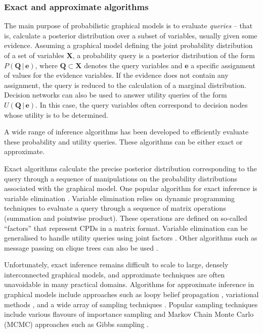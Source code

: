 \subsubsection*{Exact and approximate algorithms}
The main purpose of probabilistic graphical models is to evaluate \textit{queries} -- that is, calculate a posterior distribution over a subset of variables, usually given some evidence. Assuming a graphical model defining the joint probability distribution of a set of variables $\mathbf{X}$, a probability query is a posterior distribution of the form $P(\mathbf{Q}  \, | \, \mathbf{e})$, where $\mathbf{Q} \subset \mathbf{X}$ denotes the query variables and $\mathbf{e}$ a specific assignment of values for the evidence variables.  If the evidence does not contain any assignment, the query is reduced to the calculation of a marginal distribution.  Decision networks can also be used to answer utility queries of the form $U(\mathbf{Q} \, | \, \mathbf{e})$.  In this case, the query variables often correspond to decision nodes whose utility is to be determined.

A wide range of inference algorithms has been developed to efficiently evaluate these probability and utility queries. These algorithms can be either exact or approximate.  

Exact algorithms
 calculate the precise posterior distribution corresponding to the query through a sequence of manipulations on the probability distributions associated with the graphical model.  One popular algorithm for exact inference is variable elimination \citep{ZhangP96}.  Variable elimination relies on dynamic programming techniques to evaluate a query through a sequence of matrix operations (summation and pointwise product). These operations are defined on so-called ``factors'' that represent CPDs in a matrix format. Variable elimination can be generalised to handle utility queries using joint factors \citep{Koller+Friedman:09}.   Other algorithms such as message passing on clique trees can also be used \citep{jensen1990}. 

Unfortunately, exact inference remains difficult to scale to large, densely interconnected graphical models, and  approximate techniques are often unavoidable in many practical domains.  Algorithms for approximate inference
 in graphical models include approaches such as loopy belief propagation \citep{Murphy:1999}, variational methods \citep{Jordan:1999},  and a wide array of sampling techniques \citep{mackay1998introduction}. Popular sampling techniques include various flavours of importance sampling \citep{FungC89,cheng2000ais} and Markov Chain Monte Carlo (MCMC) approaches such as Gibbs sampling \citep{pearl1987evidential,gamerman2006markov}. %

